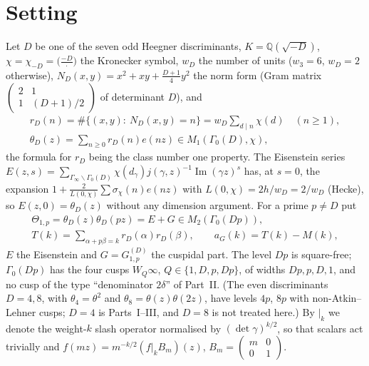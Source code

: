 \documentclass[11pt]{amsart}
\theoremstyle{remark}
\newcommand{\Q}{\mathbb{Q}}
\begin{document}
\section{Setting}
Let $D$ be one of the seven odd Heegner discriminants, $K=\Q(\sqrt{-D})$, $\chi=\chi_{-D}=\bigl(\frac{-D}\cdot\bigr)$ the Kronecker symbol, $w_D$ the number of units ($w_3=6$, $w_D=2$ otherwise), $N_D(x,y)=x^2+xy+\frac{D+1}4y^2$ the norm form (Gram matrix $\left(\begin{smallmatrix}2&1\\1&(D+1)/2\end{smallmatrix}\right)$ of determinant $D$), and
\begin{gather*}
r_D(n)=\#\{(x,y):\ N_D(x,y)=n\}=w_D\sum_{d\mid n}\chi(d)\quad(n\ge1),\\
\theta_D(z)=\sum_{n\ge0}r_D(n)e(nz)\in M_1(\Gamma_0(D),\chi),
\end{gather*}
the formula for $r_D$ being the class number one property. The Eisenstein series $E(z,s)=\sum_{\Gamma_\infty\backslash\Gamma_0(D)}\chi(d_\gamma)j(\gamma,z)^{-1}\operatorname{Im}(\gamma z)^s$ has, at $s=0$, the expansion $1+\frac2{L(0,\chi)}\sum\sigma_\chi(n)e(nz)$ with $L(0,\chi)=2h/w_D=2/w_D$ (Hecke), so $E(z,0)=\theta_D(z)$ without any dimension argument. For a prime $p\ne D$ put
\begin{gather*}
\Theta_{1,p}=\theta_D(z)\theta_D(pz)=E+G\in M_2(\Gamma_0(Dp)),\\
T(k)=\sum_{\alpha+p\beta=k}r_D(\alpha)r_D(\beta),\qquad a_G(k)=T(k)-M(k),
\end{gather*}
$E$ the Eisenstein and $G=G^{(D)}_{1,p}$ the cuspidal part. The level $Dp$ is square-free; $\Gamma_0(Dp)$ has the four cusps $W_Q\infty$, $Q\in\{1,D,p,Dp\}$, of widths $Dp,p,D,1$, and no cusp of the type ``denominator $2\delta$'' of Part~II. (The even discriminants $D=4,8$, with $\theta_4=\theta^2$ and $\theta_8=\theta(z)\theta(2z)$, have levels $4p$, $8p$ with non-Atkin--Lehner cusps; $D=4$ is Parts~I--III, and $D=8$ is not treated here.) By $|_k$ we denote the weight-$k$ slash operator normalised by $(\det\gamma)^{k/2}$, so that scalars act trivially and $f(mz)=m^{-k/2}(f|_kB_m)(z)$, $B_m=\left(\begin{smallmatrix}m&0\\0&1\end{smallmatrix}\right)$.
\end{document}

